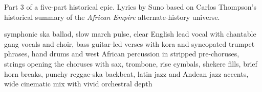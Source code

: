
\begin{notes}
Part 3 of a five-part historical epic. Lyrics by Suno based on Carlos Thompson's historical summary of the \emph{African Empire} alternate-history universe.
\end{notes}
\begin{style}
symphonic ska ballad, slow march pulse, clear English lead vocal with chantable gang vocals and choir, bass guitar-led verses with kora and syncopated trumpet phrases, hand drums and west African percussion in stripped pre-choruses, strings opening the choruses with sax, trombone, rise cymbals, shekere fills, brief horn breaks, punchy reggae-ska backbeat, latin jazz and Andean jazz accents, wide cinematic mix with vivid orchestral depth
\end{style}

